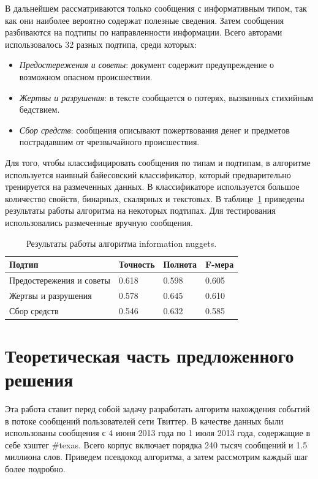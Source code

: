\documentclass[12pt, a4paper]{article}
\begin{document}
	В дальнейшем рассматриваются только сообщения с информативным типом, так как они наиболее вероятно содержат полезные сведения. Затем сообщения разбиваются на подтипы по направленности информации. Всего авторами использовалось 32 разных подтипа, среди которых:
	\begin{itemize}
	\item\emph{Предостережения и советы}: документ содержит предупреждение о возможном опасном происшествии.
	\item\emph{Жертвы и разрушения}: в тексте сообщается о потерях, вызванных стихийным бедствием.
	\item\emph{Сбор средств}: сообщения описывают пожертвования денег и предметов пострадавшим от чрезвычайного происшествия.
	\end{itemize}
	
	Для того, чтобы классифицировать сообщения по типам и подтипам, в алгоритме используется наивный байесовский классификатор, который предварительно тренируется на размеченных данных. В классификаторе используется большое количество свойств, бинарных, скалярных и текстовых. В таблице~\ref{nuggets-table} приведены результаты работы алгоритма на некоторых подтипах. Для тестирования использовались размеченные вручную сообщения.
	\begin{table}[h]
	\centering
	\begin{tabular}{ l l l l}
	Подтип & Точность & Полнота & F-мера \\ \hline
	Предостережения и советы & 0.618 & 0.598 & 0.605 \\ 
	Жертвы и разрушения & 0.578 & 0.645 & 0.610 \\ 
	Сбор средств & 0.546 & 0.632 & 0.585 \\ \hline
	\end{tabular}
	\caption{Результаты работы алгоритма information nuggets.}
	\label{nuggets-table}
	\end{table}
  
  \section{Теоретическая часть предложенного решения}
  Эта работа ставит перед собой задачу разработать алгоритм нахождения событий в потоке сообщений пользователей сети Твиттер. В качестве данных были использованы сообщения с 4 июня 2013 года по 1 июля 2013 года, содержащие в себе хэштег \#texas. Всего корпус включает порядка 240 тысяч сообщений и 1.5 миллиона слов. Приведем псевдокод алгоритма, а затем рассмотрим каждый шаг более подробно. 
  
\end{document}
